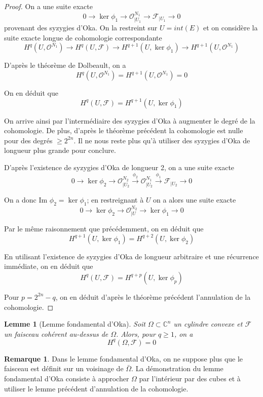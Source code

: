 \documentclass{article}
\newtheorem{lemme}[theoreme]{Lemme}
\theoremstyle{definition}
\theoremstyle{remarque}
\newtheorem{remarque}{Remarque}
\begin{document}
\begin{proof}
On a une suite exacte
$$0 \to \ker \phi_1 \to \mathcal{O}^{N_1}_{|U_1} \to \mathcal{F}_{|U_1} \to 0$$
provenant des syzygies d'Oka. On la restreint sur $U=int(E)$ et on considère la suite exacte longue de cohomologie correspondante
$$H^q(U, \mathcal{O}^{N_1}) \to H^q(U, \mathcal{F}) \to  H^{q+1}(U, \ker \phi_1) \to H^{q+1}(U, \mathcal{O}^{N_1})$$

D'après le théorème de Dolbeault, on a
$$H^q(U, \mathcal{O}^{N_1}) =  H^{q+1}(U, \mathcal{O}^{N_1}) = 0$$

On en déduit que $$H^q(U, \mathcal{F}) =  H^{q+1}(U, \ker \phi_1)$$

On arrive ainsi par l'intermédiaire des syzygies d'Oka à augmenter le degré de la cohomologie. De plus, d'après le théorème précédent la cohomologie est nulle pour des degrés $\geq 2^{2n}$. Il ne nous reste plus qu'à utiliser des syzygies d'Oka de longueur plus grande pour conclure.

D'après l'existence de syzygies d'Oka de longueur 2, on a une suite exacte
$$0 \to \ker \phi_2 \to \mathcal{O}^{N_2}_{|U_2} \overset{\phi_2}{\to} \mathcal{O}^{N_1}_{|U_2} \overset{\phi_1}{\to} \mathcal{F}_{|U_2} \to 0$$

On a donc Im $\phi_2 = \ker \phi_1$; en restreignant à $U$ on a alors une suite exacte
$$0 \to \ker \phi_2 \to \mathcal{O}^{N_2}_{|U} \to \ker \phi_1 \to 0$$

Par le même raisonnement que précédemment, on en déduit que
$$H^{q+1}(U, \ker \phi_1) =  H^{q+2}(U, \ker \phi_2)$$

En utilisant l'existence de syzygies d'Oka de longueur arbitraire et une récurrence immédiate, on en déduit que
$$H^q(U, \mathcal{F}) =  H^{q+p}(U, \ker \phi_p)$$

Pour $p = 2^{2n}-q$, on en déduit d'après le théorème précédent l'annulation de la cohomologie.
\end{proof}

\begin{lemme}[Lemme fondamental d'Oka]
Soit $\Omega \subset \mathbb{C}^n$ un cylindre convexe et $\mathcal{F}$ un faisceau cohérent au-dessus de $\Omega$. Alors, pour $q \geq 1$, on a
$$H^q(\Omega, \mathcal{F})=0$$
\end{lemme}

\begin{remarque}
Dans le lemme fondamental d'Oka, on ne suppose plus que le faisceau est définit sur un voisinage de $\bar{\Omega}$. La démonstration du lemme fondamental d'Oka consiste à approcher $\Omega$ par l'intérieur par des cubes et à utiliser le lemme précédent d'annulation de la cohomologie.
\end{remarque}
\end{document}
